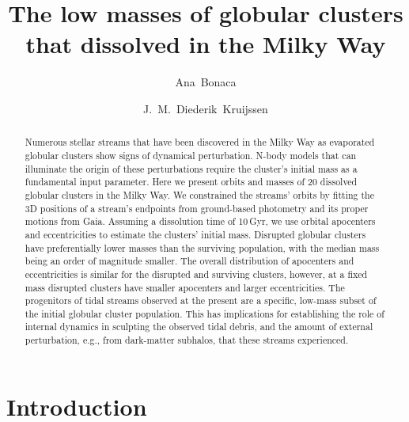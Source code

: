 \documentclass[twocolumn]{aastex63}
\begin{document}
\sloppy\sloppypar\raggedbottom\frenchspacing %

\title{The low masses of globular clusters that dissolved in the Milky Way}


\author[0000-0002-7846-9787]{Ana~Bonaca}

\author[0000-0002-8804-0212]{J.~M.~Diederik~Kruijssen}


\begin{abstract}\noindent %
Numerous stellar streams that have been discovered in the Milky Way as evaporated globular clusters show signs of dynamical perturbation.
N-body models that can illuminate the origin of these perturbations require the cluster's initial mass as a fundamental input parameter.
Here we present orbits and masses of 20 dissolved globular clusters in the Milky Way.
We constrained the streams' orbits by fitting the 3D positions of a stream's endpoints from ground-based photometry and its proper motions from Gaia.
Assuming a dissolution time of 10\,Gyr, we use orbital apocenters and eccentricities to estimate the clusters' initial mass.
Disrupted globular clusters have preferentially lower masses than the surviving population, with the median mass being an order of magnitude smaller.
The overall distribution of apocenters and eccentricities is similar for the disrupted and surviving clusters, however, at a fixed mass disrupted clusters have smaller apocenters and larger eccentricities.
The progenitors of tidal streams observed at the present are a specific, low-mass subset of the initial globular cluster population.
This has implications for establishing the role of internal dynamics in sculpting the observed tidal debris, and the amount of external perturbation, e.g., from dark-matter subhalos, that these streams experienced.
\end{abstract}

\section{Introduction}
\label{sec:intro}
\end{document}
